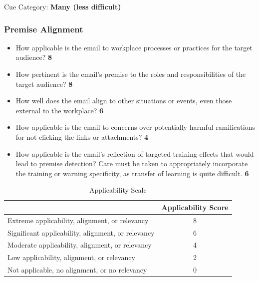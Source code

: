 \begin{fullwidth}
Cue Category: \textbf{Many (less difficult)}

\subsubsection{Premise Alignment} %

\begin{itemize}
    \item How applicable is the email to workplace processes or practices for the target
audience? \textbf{8}
    \item How pertinent is the email’s premise to the roles and responsibilities of the
target audience? \textbf{8}
    \item How well does the email align to other situations or events, even those external
to the workplace? \textbf{6}
    \item How applicable is the email to concerns over potentially harmful ramifications
for not clicking the links or attachments? \textbf{4}
    \item How applicable is the email’s reflection of targeted training effects that would
lead to premise detection? Care must be taken to appropriately incorporate the
training or warning specificity, as transfer of learning is quite difficult. \textbf{6}
\end{itemize}

\begin{table}[H]
\centering
\begin{tabular}{|l|c|}
\hline
\rowcolor[HTML]{96BEE6} 
\multicolumn{1}{|c|}{\cellcolor[HTML]{96BEE6}\textbf{Applicability Scale}} & \textbf{Applicability Score} \\ \hline
Extreme applicability, alignment, or relevancy                    & 8                   \\ \hline
Significant applicability, alignment, or relevancy                & 6                   \\ \hline
Moderate applicability, alignment, or relevancy                   & 4                   \\ \hline
Low applicability, alignment, or relevancy                        & 2                   \\ \hline
Not applicable, no alignment, or no relevancy                     & 0                   \\ \hline
\end{tabular}
\captionsetup{justification=centering}
\caption{Applicability Scale}
\end{table}


\end{fullwidth}
